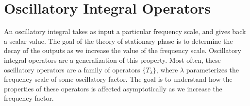 \section{Oscillatory Integral Operators}

An oscillatory integral takes as input a particular frequency scale, and gives back a scalar value. The goal of the theory of stationary phase is to determine the decay of the outputs as we increase the value of the frequency scale. Oscillatory integral operators are a generalization of this property. Most often, these oscillatory operators are a family of operators $\{ T_\lambda \}$, where $\lambda$ parameterizes the frequency scale of some oscillatory factor. The goal is to understand how the properties of these operators is affected asymptotically as we increase the frequency factor.

